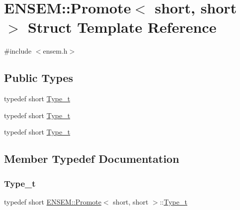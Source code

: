\hypertarget{structENSEM_1_1Promote_3_01short_00_01short_01_4}{}\section{E\+N\+S\+EM\+:\+:Promote$<$ short, short $>$ Struct Template Reference}
\label{structENSEM_1_1Promote_3_01short_00_01short_01_4}


{\ttfamily \#include $<$ensem.\+h$>$}

\subsection*{Public Types}
\begin{DoxyCompactItemize}
\item 
typedef short \mbox{\hyperlink{structENSEM_1_1Promote_3_01short_00_01short_01_4_a6b4eee8b5b19e8dd07645327f1e73377}{Type\+\_\+t}}
\item 
typedef short \mbox{\hyperlink{structENSEM_1_1Promote_3_01short_00_01short_01_4_a6b4eee8b5b19e8dd07645327f1e73377}{Type\+\_\+t}}
\item 
typedef short \mbox{\hyperlink{structENSEM_1_1Promote_3_01short_00_01short_01_4_a6b4eee8b5b19e8dd07645327f1e73377}{Type\+\_\+t}}
\end{DoxyCompactItemize}


\subsection{Member Typedef Documentation}
\mbox{\label{structENSEM_1_1Promote_3_01short_00_01short_01_4_a6b4eee8b5b19e8dd07645327f1e73377}} 
\subsubsection{\texorpdfstring{Type\_t}{Type\_t}\hspace{0.1cm}{\footnotesize\ttfamily [1/3]}}
{\footnotesize\ttfamily typedef short \mbox{\hyperlink{structENSEM_1_1Promote}{E\+N\+S\+E\+M\+::\+Promote}}$<$ short, short $>$\+::\mbox{\hyperlink{structENSEM_1_1Promote_3_01short_00_01short_01_4_a6b4eee8b5b19e8dd07645327f1e73377}{Type\+\_\+t}}}

